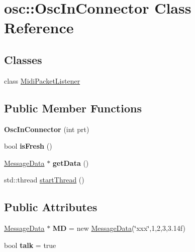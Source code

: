 \hypertarget{classosc_1_1OscInConnector}{\section{osc\-:\-:Osc\-In\-Connector Class Reference}
\label{classosc_1_1OscInConnector}
}
\subsection*{Classes}
\begin{DoxyCompactItemize}
\item 
class \hyperlink{classOscInConnector_1_1MidiPacketListener}{Midi\-Packet\-Listener}
\end{DoxyCompactItemize}
\subsection*{Public Member Functions}
\begin{DoxyCompactItemize}
\item 
\hypertarget{classosc_1_1OscInConnector_acb8cca9cec941690ed0dcee6611c4553}{{\bfseries Osc\-In\-Connector} (int prt)}\label{classosc_1_1OscInConnector_acb8cca9cec941690ed0dcee6611c4553}

\item 
\hypertarget{classosc_1_1OscInConnector_a6603048c9ba0e9356a8dd0f5ffc1055f}{bool {\bfseries is\-Fresh} ()}\label{classosc_1_1OscInConnector_a6603048c9ba0e9356a8dd0f5ffc1055f}

\item 
\hypertarget{classosc_1_1OscInConnector_aa7130d46061b498d0f8648c0bd9c4146}{\hyperlink{classosc_1_1MessageData}{Message\-Data} $\ast$ {\bfseries get\-Data} ()}\label{classosc_1_1OscInConnector_aa7130d46061b498d0f8648c0bd9c4146}

\item 
std\-::thread \hyperlink{classosc_1_1OscInConnector_af546d19cf2adc1ed7c701a4804586cb9}{start\-Thread} ()
\end{DoxyCompactItemize}
\subsection*{Public Attributes}
\begin{DoxyCompactItemize}
\item 
\hypertarget{classosc_1_1OscInConnector_a1fd59b88007b9942b275aaa1f6c7bbc1}{\hyperlink{classosc_1_1MessageData}{Message\-Data} $\ast$ {\bfseries M\-D} = new \hyperlink{classosc_1_1MessageData}{Message\-Data}(\char`\"{}xxx\char`\"{},1,2,3,3.\-14f)}\label{classosc_1_1OscInConnector_a1fd59b88007b9942b275aaa1f6c7bbc1}

\item 
\hypertarget{classosc_1_1OscInConnector_a8a88a1532af47166b8e7c91da8d47662}{bool {\bfseries talk} = true}\label{classosc_1_1OscInConnector_a8a88a1532af47166b8e7c91da8d47662}

\end{DoxyCompactItemize}


